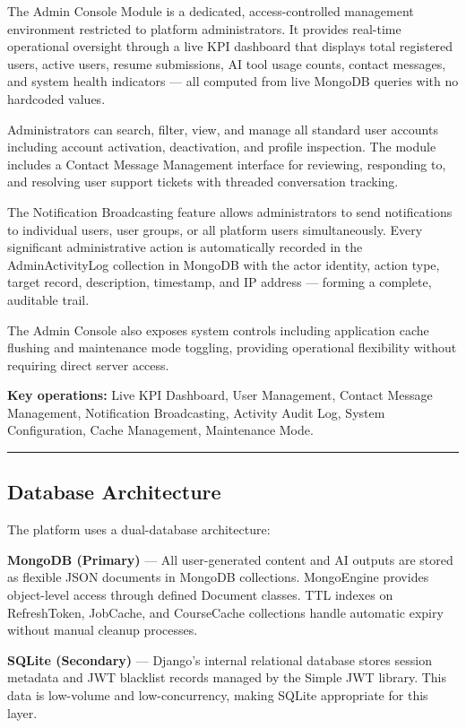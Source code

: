 \documentclass[12pt]{article}
\begin{document}
The Admin Console Module is a dedicated, access-controlled management environment restricted to platform administrators. It provides real-time operational oversight through a live KPI dashboard that displays total registered users, active users, resume submissions, AI tool usage counts, contact messages, and system health indicators — all computed from live MongoDB queries with no hardcoded values.

Administrators can search, filter, view, and manage all standard user accounts including account activation, deactivation, and profile inspection. The module includes a Contact Message Management interface for reviewing, responding to, and resolving user support tickets with threaded conversation tracking.

The Notification Broadcasting feature allows administrators to send notifications to individual users, user groups, or all platform users simultaneously. Every significant administrative action is automatically recorded in the AdminActivityLog collection in MongoDB with the actor identity, action type, target record, description, timestamp, and IP address — forming a complete, auditable trail.

The Admin Console also exposes system controls including application cache flushing and maintenance mode toggling, providing operational flexibility without requiring direct server access.

\textbf{Key operations:} Live KPI Dashboard, User Management, Contact Message Management, Notification Broadcasting, Activity Audit Log, System Configuration, Cache Management, Maintenance Mode.

\noindent\rule{\textwidth}{0.4pt}

\subsection{Database Architecture}

The platform uses a dual-database architecture:

\textbf{MongoDB (Primary)} — All user-generated content and AI outputs are stored as flexible JSON documents in MongoDB collections. MongoEngine provides object-level access through defined Document classes. TTL indexes on RefreshToken, JobCache, and CourseCache collections handle automatic expiry without manual cleanup processes.

\textbf{SQLite (Secondary)} — Django's internal relational database stores session metadata and JWT blacklist records managed by the Simple JWT library. This data is low-volume and low-concurrency, making SQLite appropriate for this layer.
\end{document}
